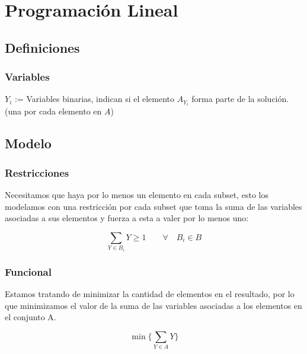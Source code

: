 \section{Programaci\'on Lineal}

\subsection{Definiciones}

\subsubsection{Variables}

\begin{center}
    $Y_i$ := Variables binarias, indican si el elemento $A_{Y_i}$ forma parte
    de la soluci\'on. \\ (una por cada elemento en $A$)
\end{center}

\subsection{Modelo}

\subsubsection{Restricciones}

Necesitamos que haya por lo menos un elemento en cada subset, esto los
modelamos con una restricci\'on por cada subset que toma la suma de las
variables asociadas a sus elementos y fuerza a esta a valer por lo menos uno:

\begin{equation}
    \sum_{Y \in B_i} Y \ge 1 \qquad \forall \quad B_i \in B
\end{equation}

\subsubsection{Funcional}

Estamos tratando de minimizar la cantidad de elementos en el resultado, por lo
que minimizamos el valor de la suma de las variables asociadas a los elementos
en el conjunto A.

\begin{equation}
    \min \{ \sum_{Y \in A} Y \}
\end{equation}

